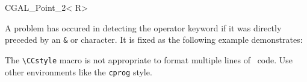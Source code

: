 \documentclass[12pt]{article}
\begin{document}
\begin{classtemplate}{CGAL_Point_2< R>}
\end{classtemplate}

A problem has occured in detecting the operator keyword if it was
directly preceded by an {\tt \&} or {\tt *} character. It is fixed as
the following example demonstrates:


%
%

The \verb+\CCstyle+ macro is not appropriate to format multiple lines
of \CC\ code. Use other environments like the {\tt cprog} style.
\end{document}
